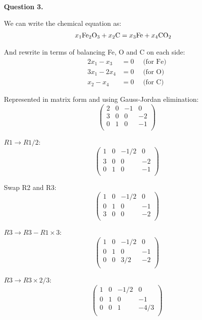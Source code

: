 \documentclass[12pt,a4paper]{report}
\begin{document}
\textbf{Question 3.}

We can write the chemical equation as:
\begin{align*}
 x_1\text{Fe\textsubscript{2}O\textsubscript{3}} + x_2\text{C} &= x_3\text{Fe} + x_4\text{CO\textsubscript{2}}
\end{align*} 

And rewrite in terms of balancing Fe, O and C on each side:
\begin{align*}
2x_1 - x_3 &= 0 \quad \text{ (for Fe)}\\
3x_1 - 2x_4 &= 0 \quad \text{ (for O)} \\
x_2 - x_4 &= 0 \quad \text{ (for C)}
\end{align*} 

Represented in matrix form and using Gauss-Jordan elimination:
 \[
 \left(\begin{array}{rrrr}
   2 & 0 & -1 & 0 \\
   3 & 0 & 0  & -2 \\
   0 & 1 & 0  & -1 \\
   \end{array} \right)
\]

\( R1 \rightarrow R1/2 \):
 \[
 \left(\begin{array}{rrrr}
   1 & 0 & -1/2 & 0 \\
   3 & 0 & 0  & -2 \\
   0 & 1 & 0  & -1 \\
   \end{array} \right)
\]

Swap R2 and R3:
 \[
 \left(\begin{array}{rrrr}
   1 & 0 & -1/2 & 0 \\
   0 & 1 & 0  & -1 \\
   3 & 0 & 0  & -2 \\
   \end{array} \right)
\]

\( R3 \rightarrow R3 - R1 \times 3 \):
 \[
 \left(\begin{array}{rrrr}
   1 & 0 & -1/2 & 0 \\
   0 & 1 & 0  & -1 \\
   0 & 0 & 3/2 & -2 \\
   \end{array} \right)
\]

\( R3 \rightarrow R3 \times 2/3 \):
 \[
 \left(\begin{array}{rrrr}
   1 & 0 & -1/2 & 0 \\
   0 & 1 & 0  & -1 \\
   0 & 0 & 1 & -4/3 \\
   \end{array} \right)
\]
\end{document}
